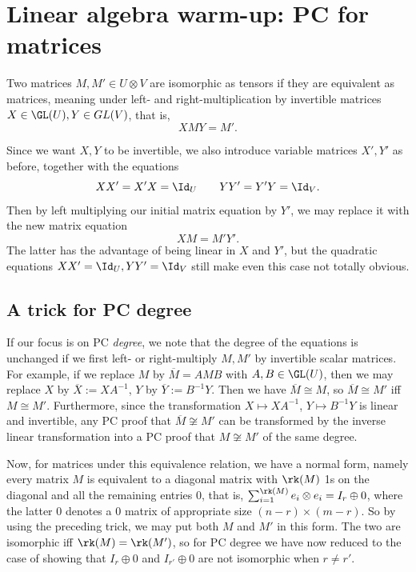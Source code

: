

\section{Linear algebra warm-up: PC for matrices}
\label{sec:matrix}
Two matrices $M,M' \in U \otimes V$ are isomorphic as tensors if they are equivalent as matrices, meaning under left- and right-multiplication by invertible matrices $X \in \GL(U), Y \in GL(V)$, that is, 
\[
XMY = M'. 
\]

Since we want $X,Y$ to be invertible, we also introduce variable matrices $X', Y'$ as before, together with the equations
\[
XX' = X'X = \Id_U \qquad YY' = Y'Y = \Id_V.
\]
Then by left multiplying our initial matrix equation by $Y'$, we may replace it with the new matrix equation
\[
XM = M'Y'.
\]
The latter has the advantage of being linear in $X$ and $Y'$, but the quadratic equations $XX' =  \Id_U, YY' =  \Id_V$ still make even this case not totally obvious.

\subsection{A trick for PC degree} \label{sec:trick}
If our focus is on PC \emph{degree}, we note that the degree of the equations is unchanged if we first left- or right-multiply $M,M'$ by invertible scalar matrices. For example, if we replace $M$ by $\overline{M} = AMB$ with $A,B \in \GL(U)$, then we may replace $X$ by $\overline{X} := XA^{-1}$, $Y$ by $\overline{Y} := B^{-1} Y$. Then we have $\overline{M} \cong M$, so $\overline{M} \cong M'$ iff $M \cong M'$. Furthermore, since the transformation $X \mapsto XA^{-1}$, $Y \mapsto B^{-1} Y$ is linear and invertible, any PC proof that $\overline{M} \not\cong M'$ can be transformed by the inverse linear transformation into a PC proof that $M \not\cong M'$ of the same degree.

Now, for matrices under this equivalence relation, we have a normal form, namely every matrix $M$ is equivalent to a diagonal matrix with $\rk(M)$ 1s on the diagonal and all the remaining entries $0$, that is, $\sum_{i=1}^{\rk(M)} e_i \otimes e_i = I_r \oplus 0$, where the latter $0$ denotes a $0$ matrix of appropriate size $(n-r) \times (m-r)$. So by using the preceding trick, we may put both $M$ and $M'$ in this form. The two are isomorphic iff $\rk(M) = \rk(M')$, so for PC degree we have now reduced to the case of showing that $I_r \oplus 0$ and $I_{r'} \oplus 0$ are not isomorphic when $r \neq r'$. 

